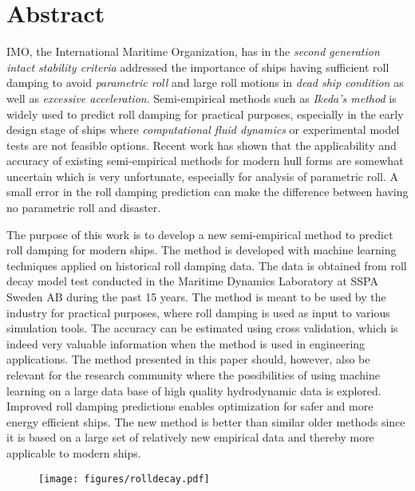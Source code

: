 \section{Abstract}
\label{se:abstract}
IMO, the International Maritime Organization, has in the \emph{second generation intact stability criteria} addressed the importance of ships having sufficient roll damping to avoid \emph{parametric roll} and large roll motions in \emph{dead ship condition} as well as \emph{excessive acceleration}. Semi-empirical methods such as \emph{Ikeda’s method} is widely used to predict roll damping for practical purposes, especially in the early design stage of ships where \emph{computational fluid dynamics} or experimental model tests are not feasible options. Recent work has shown that the applicability and accuracy of existing semi-empirical methods for modern hull forms are somewhat uncertain which is very unfortunate, especially for analysis of parametric roll. A small error in the roll damping prediction can make the difference between having no parametric roll and disaster.

The purpose of this work is to develop a new semi-empirical method to predict roll damping for modern ships. The method is developed with machine learning techniques applied on historical roll damping data. The data is obtained from roll decay model test conducted in the Maritime Dynamics Laboratory at SSPA Sweden AB during the past 15 years. The method is meant to be used by the industry for practical purposes, where roll damping is used as input to various simulation tools. The accuracy can be estimated using cross validation, which is indeed very valuable information when the method is used in engineering applications. The method presented in this paper should, however, also be relevant for the research community where the possibilities of using machine learning on a large data base of high quality hydrodynamic data is explored. Improved roll damping predictions enables optimization for safer and more energy efficient ships. The new method is better than similar older methods since it is based on a large set of relatively new empirical data and thereby more applicable to modern ships.

\vspace*{-0.15in}
\begin{figure}[h]
  \centering
  \texttt{[image: figures/rolldecay.pdf]}
\end{figure}
\vspace*{-0.7in}
\newpage 